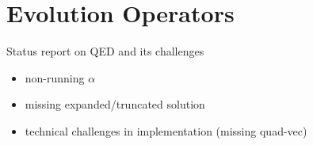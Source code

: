 
\chapter{Evolution Operators}
\label{ch:eko}
\minitoc
\adjustmtc

Status report on QED and its challenges

\begin{itemize}
	\item non-running $\alpha$
	\item missing expanded/truncated solution
	\item technical challenges in implementation (missing quad-vec)
\end{itemize}
